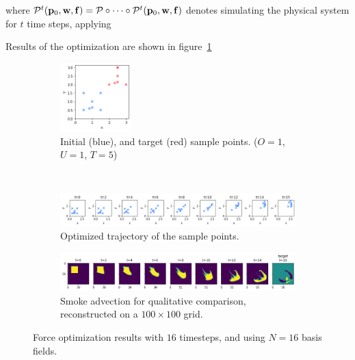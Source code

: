   where $\mathcal{P}^{t}(\vb{p}_0, \vb{w}, \vb{f}) = \mathcal{P} \circ \dots
  \circ \mathcal{P}^{t}(\vb{p}_0, \vb{w}, \vb{f})$ denotes simulating the
  physical system for $t$ time steps, applying 



Results of the optimization are shown in figure~\ref{fig:f_optim}

\begin{figure}
  \centering
  \begin{subfigure}{\textwidth}
    \centering
    \includegraphics[width=0.3\textwidth]{figures/f-optim/blue_start_red_target.png}
    \caption{Initial (blue), and target (red) sample points. ($O=1$, $U=1$,
    $T=5$)}
  \end{subfigure}\\
  \begin{subfigure}{\textwidth}
    \centering
    \includegraphics[width=\textwidth]{figures/f-optim/trajectory_horizontal.png}
    \caption{Optimized trajectory of the sample points.}
  \end{subfigure}\par\medskip
  \begin{subfigure}{\textwidth}
    \centering
    \includegraphics[width=\textwidth]{figures/f-optim/smoke_trajectory_horizontal.png}
    \caption{Smoke advection for qualitative comparison, reconstructed on
    a $100\times 100$ grid.}
  \end{subfigure}\par\medskip
  \caption{Force optimization results with $16$ timesteps, and using $N=16$
  basis fields.}
  \label{fig:f_optim}
\end{figure}

